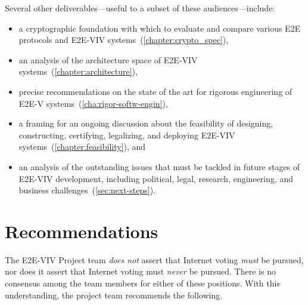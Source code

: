 Several other deliverables---useful to a subset of these
audiences---include:
\begin{itemize}
\item a cryptographic foundation with which to evaluate and compare
  various E2E protocols and E2E-VIV
  systems~(\autoref{chapter:crypto_spec}),
\item an analysis of the architecture space of E2E-VIV
  systems~(\autoref{chapter:architecture}),
\item precise recommendations on the state of the art for rigorous
  engineering of E2E-V systems~(\autoref{cha:rigor-softw-engin}),
\item a framing for an ongoing discussion about the feasibility of
  designing, constructing, certifying, legalizing, and deploying
  E2E-VIV systems~(\autoref{chapter:feasibility}), and
\item an analysis of the outstanding issues that must be tackled in
  future stages of E2E-VIV development, including political, legal,
  research, engineering, and business
  challenges~(\autoref{sec:next-steps}).
\end{itemize}

\section{Recommendations}

The E2E-VIV Project team \emph{does not} assert that Internet voting
\emph{must} be pursued, nor does it assert that Internet voting must
\emph{never} be pursued. There is no consensus among the team members
for either of these positions. With this understanding, the project
team recommends the following.

%

